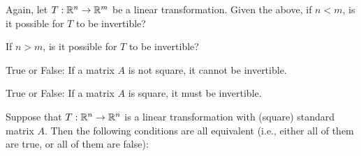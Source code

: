 \edXsolution{
}

\endedxproblem


Again, let $T: \mathbb R^n \rightarrow \mathbb R^m$ be a linear transformation.  Given the above, 
if $n<m$, is it possible for $T$ to be invertible?


If $n>m$, is it possible for $T$ to be invertible?



\edXsolution{
}

\endedxproblem


\endedxvertical










True or False: If a matrix $A$ is not square, it cannot be invertible.  


True or False: If a matrix $A$ is square, it must be invertible.  



\endedxproblem


\endedxvertical






{}  Suppose that $T: \mathbb R^n \rightarrow \mathbb R^n$ is a linear transformation
with (square) standard matrix $A$.  Then the following conditions are all equivalent (i.e., either all of
them are true, or all of them are false):

